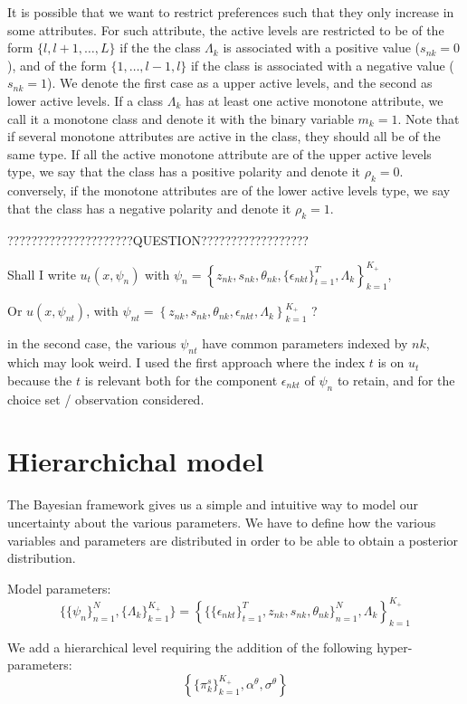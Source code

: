 \documentclass[12pt]{article}
\begin{document}
It is possible that we want to restrict preferences such that they only increase in some attributes.
For such attribute, the active levels are restricted to be of the form $\{l,l+1,\ldots,L\}$ if the the class $\Lambda_k$ is associated with a positive value ($s_{nk}=0$), and of the form $\{1,\ldots,l-1,l\}$ if the class is associated with a negative value ($s_{nk}=1$). We denote the first case as a upper active levels, and the second as lower active levels. If a class $\Lambda_k$ has at least one active monotone attribute, we call it a monotone class and denote it with the binary variable $m_k=1$.
Note that if several monotone attributes are active in the class, they should all be of the same type. If all the active monotone attribute are of the upper active levels type, we say that the class has a positive polarity and denote it $\rho_k=0$. conversely, if the monotone attributes are of the lower active levels type, we say that the class has a negative polarity and denote it $\rho_k=1$.


?????????????????????QUESTION??????????????????

Shall I write $u_t(x,\psi_n)$ with $\psi_n = \left\{ z_{nk}, s_{nk},\theta_{nk}, \{\epsilon_{nkt}\}_{t=1}^T , \Lambda_{k} \right\}_{k=1}^{K_+}$, 

Or $u(x,\psi_{nt})$, with $\psi_{nt} = \left\{ z_{nk}, s_{nk},\theta_{nk}, \epsilon_{nkt}, \Lambda_{k} \right\}_{k=1}^{K_+}$ ?

in the second case, the various $\psi_{nt}$ have common parameters indexed by $nk$, which may look weird. I used the first approach where the index $t$ is on $u_t$ because the $t$ is relevant both for the component $\epsilon_{nkt}$ of $\psi_n$ to retain, and for the choice set / observation considered. 

\section{Hierarchichal model}

The Bayesian framework gives us a simple and intuitive way to model our uncertainty about the various parameters. We have to define how the various variables and parameters are distributed in order to be able to obtain a posterior distribution.

Model parameters:
$$ \{ \{\psi_n\}_{n=1}^N,\{\Lambda_{k}\}_{k=1}^{K_+} \} 
= \left\{ \{\{\epsilon_{nkt}\}_{t=1}^T, z_{nk},s_{nk}, \theta_{nk} \}_{n=1}^N, \Lambda_{k} \right\}_{k=1}^{K_+}$$

We add a hierarchical level requiring the addition of the following hyper-parameters:
$$ \left\{  \{\pi_k^s\}_{k=1}^{K_+}, \alpha^\theta, \sigma^\theta  \right\} $$
\end{document}
